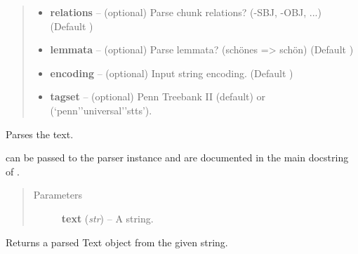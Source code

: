 \documentclass[letterpaper,10pt,english]{sphinxmanual}
\begin{document}
\begin{fulllineitems}
\begin{quote}
\begin{description}
\begin{itemize}
\item {} 
\textbf{relations} -- (optional) Parse chunk relations? (-SBJ, -OBJ, ...) (Default )

\item {} 
\textbf{lemmata} -- (optional) Parse lemmata? (schönes =\textgreater{} schön) (Default )

\item {} 
\textbf{encoding} -- (optional) Input string encoding. (Default )

\item {} 
\textbf{tagset} -- (optional) Penn Treebank II (default) or (`penn'\textbar{}'universal'\textbar{}'stts').

\end{itemize}

\end{description}\end{quote}

\begin{fulllineitems}
\label{api_reference:textblob_de.parsers.PatternParser.parse}
Parses the text.

 can be passed to the parser instance and
are documented in the main docstring of
{\hyperref[api_reference:textblob_de.parsers.PatternParser]{}}.
\begin{quote}\begin{description}
\item[{Parameters}] \leavevmode
\textbf{text} (\emph{str}) -- A string.

\end{description}\end{quote}

\end{fulllineitems}


\begin{fulllineitems}
\label{api_reference:textblob_de.parsers.PatternParser.parsetree}
Returns a parsed  Text object from the given string.

\end{fulllineitems}


\end{fulllineitems}
\end{document}
